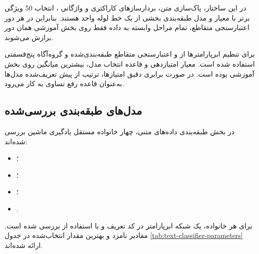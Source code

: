 \documentclass[12pt,a4paper,oneside]{report}
\begin{document}
در این ساختار، پاک‌سازی متن، بردارسازهای کاراکتری و واژگانی
،
انتخاب 50 ویژگی برتر با معیار
و مدل طبقه‌بندی بخشی از یک خط لوله واحد هستند. بنابراین در هر دور اعتبارسنجی متقاطع، تمام مراحل وابسته به داده فقط روی بخش آموزشی همان دور برازش می‌شوند.

برای تنظیم ابرپارامترها از
و اعتبارسنجی متقاطع طبقه‌بندی‌شده و گروه‌آگاه پنج‌قسمتی استفاده شده است. معیار امتیازدهی
و قاعده انتخاب مدل، بیشترین میانگین
روی بخش آموزشی بوده است. در صورت برابری دقیق امتیازها، ترتیب از پیش تعریف‌شده مدل‌ها به‌عنوان قاعده رفع تساوی به کار می‌رود.


\subsection{مدل‌های طبقه‌بندی بررسی‌شده}

در بخش طبقه‌بندی داده‌های متنی، چهار خانواده مستقل یادگیری ماشین بررسی شده‌اند:

\begin{itemize}
	\item {}؛
	\item {}؛
	\item {}؛
	\item {}.
\end{itemize}

برای هر خانواده، یک شبکه ابرپارامتر در کد تعریف و با استفاده از
بررسی شده است. مقادیر نامزد و بهترین مقدار انتخاب‌شده در جدول
\ref{tab:text-classifier-parameters}
ارائه شده‌اند.

\begin{table}[H]
\centering
\caption{فضای جست‌وجو و بهترین ابرپارامتر طبقه‌بندهای متن}
\label{tab:text-classifier-parameters}
\small
{}
\end{table}
\end{document}
